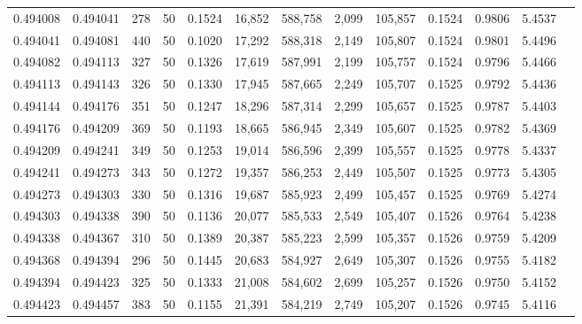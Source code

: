 \begin{tabular}{rrrrrrrrrrrrr}
0.494008 & 0.494041 & 278 &  50 &                                     0.1524 &  16,852 & 588,758 &   2,099 & 105,857 & 0.1524 & 0.9806 & 5.4537 \\
0.494041 & 0.494081 & 440 &  50 &                                     0.1020 &  17,292 & 588,318 &   2,149 & 105,807 & 0.1524 & 0.9801 & 5.4496 \\
0.494082 & 0.494113 & 327 &  50 &                                     0.1326 &  17,619 & 587,991 &   2,199 & 105,757 & 0.1524 & 0.9796 & 5.4466 \\
0.494113 & 0.494143 & 326 &  50 &                                     0.1330 &  17,945 & 587,665 &   2,249 & 105,707 & 0.1525 & 0.9792 & 5.4436 \\
0.494144 & 0.494176 & 351 &  50 &                                     0.1247 &  18,296 & 587,314 &   2,299 & 105,657 & 0.1525 & 0.9787 & 5.4403 \\
0.494176 & 0.494209 & 369 &  50 &                                     0.1193 &  18,665 & 586,945 &   2,349 & 105,607 & 0.1525 & 0.9782 & 5.4369 \\
0.494209 & 0.494241 & 349 &  50 &                                     0.1253 &  19,014 & 586,596 &   2,399 & 105,557 & 0.1525 & 0.9778 & 5.4337 \\
0.494241 & 0.494273 & 343 &  50 &                                     0.1272 &  19,357 & 586,253 &   2,449 & 105,507 & 0.1525 & 0.9773 & 5.4305 \\
0.494273 & 0.494303 & 330 &  50 &                                     0.1316 &  19,687 & 585,923 &   2,499 & 105,457 & 0.1525 & 0.9769 & 5.4274 \\
0.494303 & 0.494338 & 390 &  50 &                                     0.1136 &  20,077 & 585,533 &   2,549 & 105,407 & 0.1526 & 0.9764 & 5.4238 \\
0.494338 & 0.494367 & 310 &  50 &                                     0.1389 &  20,387 & 585,223 &   2,599 & 105,357 & 0.1526 & 0.9759 & 5.4209 \\
0.494368 & 0.494394 & 296 &  50 &                                     0.1445 &  20,683 & 584,927 &   2,649 & 105,307 & 0.1526 & 0.9755 & 5.4182 \\
0.494394 & 0.494423 & 325 &  50 &                                     0.1333 &  21,008 & 584,602 &   2,699 & 105,257 & 0.1526 & 0.9750 & 5.4152 \\
0.494423 & 0.494457 & 383 &  50 &                                     0.1155 &  21,391 & 584,219 &   2,749 & 105,207 & 0.1526 & 0.9745 & 5.4116 \\

\end{tabular}
